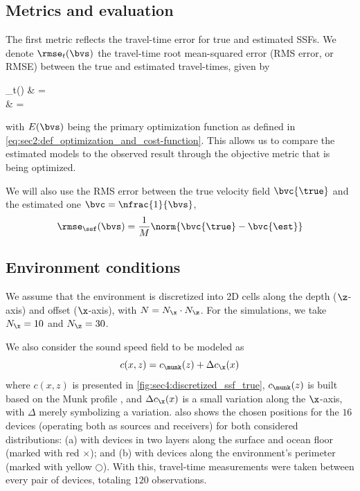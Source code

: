 \subsection{Metrics and evaluation}

The first metric reflects the travel-time error for true and estimated SSFs. We denote $\rmse_{t}(\bvs)$ the travel-time root mean-squared error (RMS error, or RMSE) between the true and estimated travel-times, given by
\begin{equations}
	\rmse_{t}(\bvs)
	& =  \\
	& = 
\end{equations}
with $E(\bvs)$ being the primary optimization function as defined in \cref{eq:sec2:def_optimization_and_cost-function}. This allows us to compare the estimated models to the observed result through the objective metric that is being optimized.

We will also use the RMS error between the true velocity field $\bvc{\true}$ and the estimated one $\bvc = \nfrac{1}{\bvs}$,
\begin{equation}
	\rmse_{\ssf}(\bvs) = \frac{1}{M} \norm{\bvc{\true} - \bvc{\est}}
\end{equation}

\subsection{Environment conditions}

We assume that the environment is discretized into 2D cells along the depth ($\z$-axis) and offset ($\x$-axis), with $N = N_{\x} \cdot N_{\z}$. For the simulations, we take $N_{\x} = 10$ and $N_{\z} = 30$.

We also consider the sound speed field to be modeled as
\begin{equation}
	c(x,z) = c_{\munk}(z) + \Delta c_{\x}(x)
\end{equation}
where $c(x,z)$ is presented in \cref{fig:sec4:discretized_ssf_true}, $c_{\munk}(z)$ is built based on the Munk profile \cite{munk}, and $\Delta c_{\x}(x)$ is a small variation along the $\x$-axis, with $\Delta$ merely symbolizing a variation.  also shows the chosen positions for the $16$ devices (operating both as sources and receivers) for both considered distributions: (a) with devices in two layers along the surface and ocean floor (marked with red $\times$); and (b) with devices along the environment's perimeter (marked with yellow $\bigcirc$). With this, travel-time measurements were taken between every pair of devices, totaling $120$ observations.

